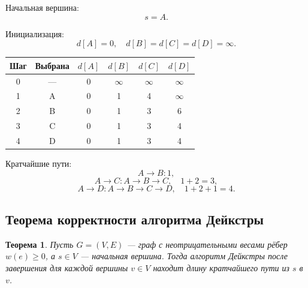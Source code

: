 \documentclass[12pt,a4paper]{article}
\newtheorem{theorem}{Теорема}
\begin{document}
\begin{center}
\end{center}

Начальная вершина:
\[
s=A.
\]

Инициализация:
\[
d[A]=0,\quad d[B]=d[C]=d[D]=\infty.
\]

\begin{center}
\begin{tabular}{|c|c|c|c|c|c|}
\hline
\textbf{Шаг} & \textbf{Выбрана} & $d[A]$ & $d[B]$ & $d[C]$ & $d[D]$ \\
\hline
0 & --- & 0 & $\infty$ & $\infty$ & $\infty$ \\
\hline
1 & A & 0 & 1 & 4 & $\infty$ \\
\hline
2 & B & 0 & 1 & 3 & 6 \\
\hline
3 & C & 0 & 1 & 3 & 4 \\
\hline
4 & D & 0 & 1 & 3 & 4 \\
\hline
\end{tabular}
\end{center}

Кратчайшие пути:
\[
A \to B: 1,
\]
\[
A \to C: A \to B \to C,\quad 1+2=3,
\]
\[
A \to D: A \to B \to C \to D,\quad 1+2+1=4.
\]

\subsection{Теорема корректности алгоритма Дейкстры}

\begin{theorem}
Пусть $G=(V,E)$ --- граф с неотрицательными весами рёбер $w(e)\geq 0$, а $s \in V$ --- начальная вершина. Тогда алгоритм Дейкстры после завершения для каждой вершины $v \in V$ находит длину кратчайшего пути из $s$ в $v$.
\end{theorem}
\end{document}
